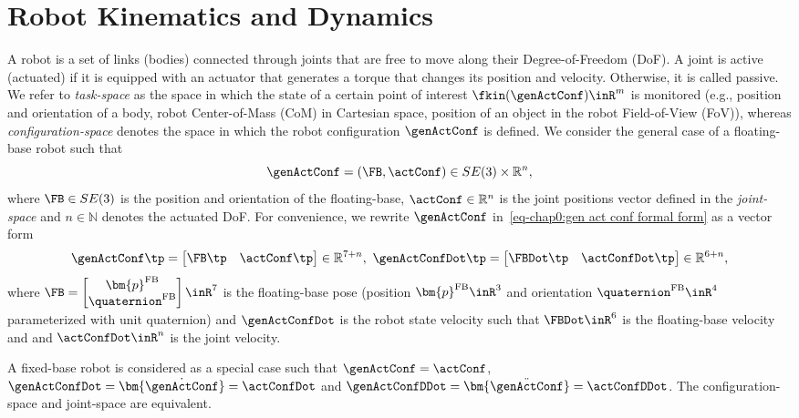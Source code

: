 \section{Robot Kinematics and Dynamics}
A robot is a set of links (bodies) connected through joints that are free to move along their Degree-of-Freedom (DoF). A joint is active (actuated) if it is equipped with an actuator that generates a torque that changes its position and velocity. Otherwise, it is called passive. We refer to \emph{task-space} as the space in which the state of a certain point of interest $\fkin(\genActConf)\inR^m$ is monitored (e.g., position and orientation of a body, robot Center-of-Mass (CoM) in Cartesian space, position of an object in the robot Field-of-View (FoV)), whereas \emph{configuration-space} denotes the space in which the robot configuration $\genActConf$ is defined. %
We consider the general case of a floating-base robot such that 
\begin{equation}\label{eq-chap0:gen act conf formal form}
	\genActConf = \left(\FB,\actConf\right)\in SE(3)\times\mathbb{R}^n,
\end{equation}
where $\FB\in SE(3)$ is the position and orientation of the floating-base, $\actConf\in\mathbb{R}^n$ is the joint positions vector defined in the \emph{joint-space} and $n\in\mathbb{N}$ denotes the actuated DoF.  For convenience, we rewrite $\genActConf$ in~\cref{eq-chap0:gen act conf formal form} as a vector form
\begin{equation}\label{eq-chap0:gen act conf def}
	\genActConf\tp = \begin{bmatrix}
		\FB\tp & \actConf\tp
	\end{bmatrix}\in\mathbb{R}^{{7+n}}, \ 
	\genActConfDot\tp = \begin{bmatrix}
		\FBDot\tp & \actConfDot\tp %
	\end{bmatrix}\in\mathbb{R}^{6+n},
\end{equation}
where $\FB=\begin{bmatrix}
	\bm{p}^{\rm FB}  \\ \quaternion^{\rm FB}
\end{bmatrix}\inR^{7}$ is the floating-base pose (position $\bm{p}^{\rm FB} \inR^3$ and  orientation $\quaternion^{\rm FB}\inR^4$ parameterized with unit quaternion) and $\genActConfDot$ is the robot state  velocity such that $\FBDot\inR^6$ is the floating-base velocity and and $\actConfDot\inR^n$ is the joint velocity. 
\begin{remark}\label{rem:fixed-base robot}
	A fixed-base robot is considered as a special case such that $\genActConf = \actConf$, $\genActConfDot = \bm{\dot{\genActConf}} = \actConfDot$ and $\genActConfDDot = \bm{\ddot{\genActConf}} = \actConfDDot$. The configuration-space and joint-space are equivalent. 
\end{remark}
